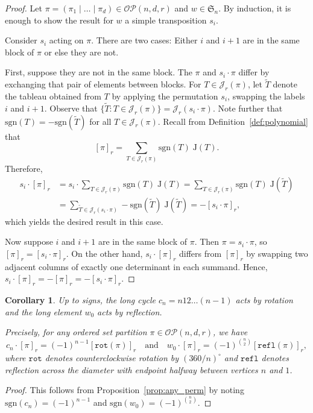 \documentclass[10pt]{amsart}
\theoremstyle{definition}
\theoremstyle{plain}
\theoremstyle{plain}
\theoremstyle{definition}
\theoremstyle{remark}
\theoremstyle{plain}
\theoremstyle{plain}
\newtheorem{corollary}[cdrthm]{Corollary}
\theoremstyle{plain}
\numberwithin{equation}{section}
\newcommand{\rstab}{\mathcal{J}}
\newcommand{\rspoly}{\mathrm{J}}
\newcommand{\sgn}{\mathrm{sgn}}
\newcommand{\ordsetpart}{\mathcal{OP}}
\begin{document}
\begin{proof}
Let $\pi=(\pi_1\mid \dots\mid \pi_d)\in\ordsetpart(n,d,r)$ and $w\in \mathfrak{S}_n$. By induction, it is enough to show the result for $w$ a simple transposition $s_i$. 

Consider $s_i$ acting on $\pi$. There are two cases: Either $i$ and $i+1$ are in the same block of $\pi$ or else they are not. 
 
First, suppose they are not in the same block. The $\pi$ and $s_i \cdot \pi$ differ by exchanging that pair of elements between blocks. For $T\in\rstab_r(\pi)$, let $\widetilde{T}$ denote the tableau obtained from $T$ by applying the permutation $s_i$, swapping the labels $i$ and $i+1$.
Observe that $\{ \widetilde{T} : T \in \rstab_r(\pi) \} = \rstab_r(s_i \cdot \pi)$.
Note further that $\sgn(T) = -\sgn(\widetilde{T})$ for all $T \in \rstab_r(\pi)$. 
Recall from Definition~\ref{def:polynomial} that \[[\pi]_r = \sum_{T\in \rstab_r(\pi)}\sgn(T) \; \rspoly(T).\]
Therefore, 
\begin{align*}  s_i \cdot [\pi]_r  &=   s_i \cdot \sum_{T\in \rstab_r(\pi)}\sgn(T) \; \rspoly(T) =  \sum_{T\in \rstab_r(\pi)} \sgn(T) \; \rspoly(\widetilde{T})  \\ &= \sum_{\tilde{T}\in \rstab_r(s_i \cdot \pi)} -\sgn(\widetilde{T}) \; \rspoly(\widetilde{T}) = -[s_i \cdot \pi]_r,
\end{align*}
which yields the desired result in this case.

Now suppose $i$ and $i+1$ are in the same block of $\pi$. Then $\pi = s_i \cdot \pi$, so $[\pi]_r = [s_i \cdot \pi]_r$. On the other hand, $s_i \cdot [\pi]_r$ differs from $[\pi]_r$ by swapping two adjacent columns of exactly one determinant in each summand. Hence, $s_i \cdot [\pi]_r = - [\pi]_r = -[s_i\cdot\pi]_r$.
\end{proof}

\begin{corollary}
\label{prop:rotation}
Up to signs, the long cycle $c_n = n12\dots (n-1)$ acts by rotation and the long element $w_0$ acts by reflection.

Precisely, for any ordered set partition $\pi \in \ordsetpart(n,d,r)$, we have 
\[
c_n \cdot [\pi]_r = (-1)^{n-1} [\mathtt{rot}(\pi)]_r \quad \text{and} \quad w_0 \cdot [\pi]_r = (-1)^{\binom{n}{2}} [\mathtt{refl}(\pi)]_r,
\]
where $\mathtt{rot}$ denotes counterclockwise rotation by $(360/n)^\circ$ and $\mathtt{refl}$ denotes reflection across the diameter with endpoint halfway between vertices $n$ and $1$.
\end{corollary}
\begin{proof}
This follows from Proposition~\ref{prop:any_perm} by noting $\sgn(c_n)=(-1)^{n-1}$ and $\sgn(w_0)=(-1)^{\binom{n}{2}}$.
\end{proof}
\end{document}
